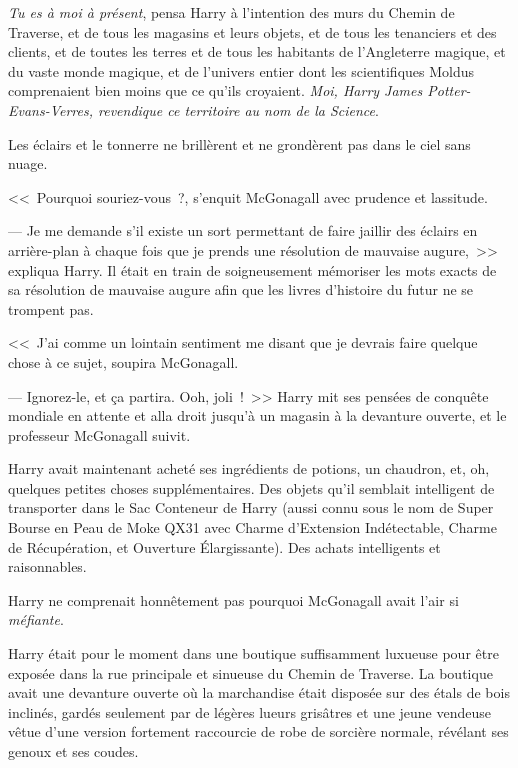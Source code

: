 \emph{Tu es à moi à présent}, pensa Harry à l'intention des murs du Chemin de Traverse, et de tous les magasins et leurs objets, et de tous les tenanciers et des clients, et de toutes les terres et de tous les habitants de l'Angleterre magique, et du vaste monde magique, et de l'univers entier dont les scientifiques Moldus comprenaient bien moins que ce qu'ils croyaient. \emph{Moi, Harry James Potter-Evans-Verres, revendique ce territoire au nom de la Science}.

Les éclairs et le tonnerre ne brillèrent et ne grondèrent pas dans le ciel sans nuage.

<<~Pourquoi souriez-vous~?, s'enquit McGonagall avec prudence et lassitude.

--- Je me demande s'il existe un sort permettant de faire jaillir des éclairs en arrière-plan à chaque fois que je prends une résolution de mauvaise augure,~>> expliqua Harry. Il était en train de soigneusement mémoriser les mots exacts de sa résolution de mauvaise augure afin que les livres d'histoire du futur ne se trompent pas.

<<~J'ai comme un lointain sentiment me disant que je devrais faire quelque chose à ce sujet, soupira McGonagall.

--- Ignorez-le, et ça partira. Ooh, joli~!~>> Harry mit ses pensées de conquête mondiale en attente et alla droit jusqu'à un magasin à la devanture ouverte, et le professeur McGonagall suivit.

\later

Harry avait maintenant acheté ses ingrédients de potions, un chaudron, et, oh, quelques petites choses supplémentaires. Des objets qu'il semblait intelligent de transporter dans le Sac Conteneur de Harry (aussi connu sous le nom de Super Bourse en Peau de Moke QX31 avec Charme d'Extension Indétectable, Charme de Récupération, et Ouverture Élargissante). Des achats intelligents et raisonnables.

Harry ne comprenait honnêtement pas pourquoi McGonagall avait l'air si \emph{méfiante}.

Harry était pour le moment dans une boutique suffisamment luxueuse pour être exposée dans la rue principale et sinueuse du Chemin de Traverse. La boutique avait une devanture ouverte où la marchandise était disposée sur des étals de bois inclinés, gardés seulement par de légères lueurs grisâtres et une jeune vendeuse vêtue d’une version fortement raccourcie de robe de sorcière normale, révélant ses genoux et ses coudes.

